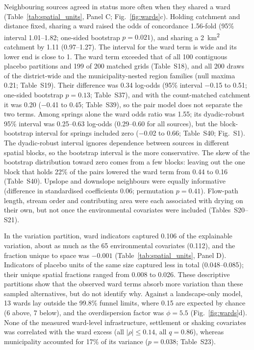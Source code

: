 \documentclass[preprint,12pt,authoryear]{elsarticle}
\begin{document}
Neighbouring sources agreed in status more often when they shared a ward (Table~\ref{tab:spatial_units}, Panel C; Fig.~\ref{fig:wards}c). Holding catchment and distance fixed, sharing a ward raised the odds of concordance 1.56-fold (95\% interval 1.01--1.82; one-sided bootstrap $p = 0.021$), and sharing a \SI{2}{\kilo\metre\squared} catchment by 1.11 (0.97--1.27). The interval for the ward term is wide and its lower end is close to 1. The ward term exceeded that of all 100 contiguous placebo partitions and 199 of 200 matched grids (Table~S18), and all 200 draws of the district-wide and the municipality-nested region families (null maxima 0.21; Table~S19). Their difference was 0.34 log-odds (95\% interval $-$0.15 to 0.51; one-sided bootstrap $p = 0.13$; Table~S37), and with the count-matched catchment it was 0.20 ($-$0.41 to 0.45; Table~S39), so the pair model does not separate the two terms. Among springs alone the ward odds ratio was 1.55; its dyadic-robust 95\% interval was 0.25--0.63 log-odds (0.29--0.60 for all sources), but the block-bootstrap interval for springs included zero ($-$0.02 to 0.66; Table~S40; Fig.~S1). The dyadic-robust interval ignores dependence between sources in different spatial blocks, so the bootstrap interval is the more conservative. The skew of the bootstrap distribution toward zero comes from a few blocks: leaving out the one block that holds 22\% of the pairs lowered the ward term from 0.44 to 0.16 (Table~S40). Upslope and downslope neighbours were equally informative (difference in standardised coefficients 0.06; permutation $p = 0.41$). Flow-path length, stream order and contributing area were each associated with drying on their own, but not once the environmental covariates were included (Tables~S20--S21).

In the variation partition, ward indicators captured 0.106 of the explainable variation, about as much as the 65 environmental covariates (0.112), and the fraction unique to space was $-0.001$ (Table~\ref{tab:spatial_units}, Panel D). Indicators of placebo units of the same size captured less in total (0.048--0.085); their unique spatial fractions ranged from 0.008 to 0.026. These descriptive partitions show that the observed ward terms absorb more variation than these sampled alternatives, but do not identify why. Against a landscape-only model, 13 wards lay outside the 99.8\% funnel limits, where 0.15 are expected by chance (6 above, 7 below), and the overdispersion factor was $\phi = 5.5$ (Fig.~\ref{fig:wards}d). None of the measured ward-level infrastructure, settlement or shaking covariates was correlated with the ward excess (all $|\rho| \leq 0.14$, all $q = 0.86$), whereas municipality accounted for 17\% of its variance ($p = 0.038$; Table~S23).
\end{document}
